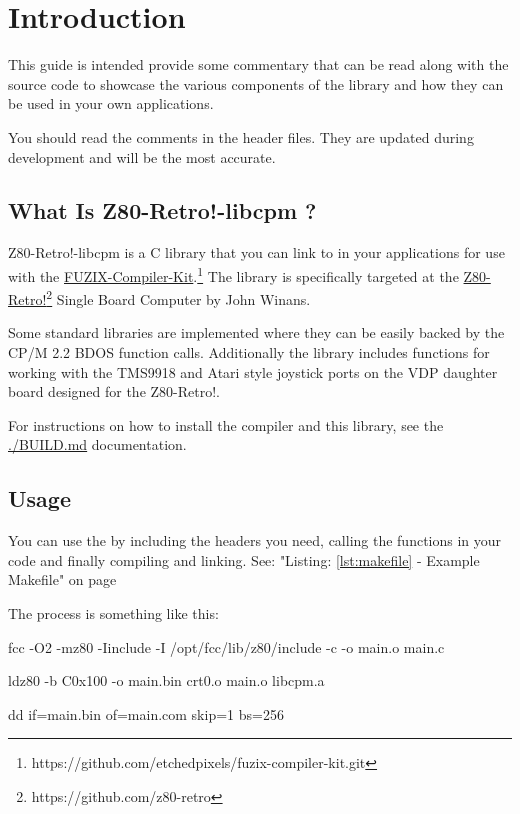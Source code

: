 \documentclass[10pt,a4paper,hidelinks]{article}
\title{\lib}
\author{David Latham}
\date{September, 2025}
\def\lib{Z80-Retro!-libcpm }
\begin{document}
\maketitle
\tableofcontents
\pagebreak
\section{Introduction}

This guide is intended provide some commentary that can be read along with the
source code to showcase the various components of the library and how they can
be used in your own applications.

You should read the comments in the header files.  They are updated during
development and will be the most accurate.

\subsection{What Is \lib?}

\lib is a C library that you can link to in your applications for
use with the
\href{https://github.com/etchedpixels/fuzix-compiler-kit.git}{FUZIX-Compiler-Kit}.\footnote{https://github.com/etchedpixels/fuzix-compiler-kit.git}
The library is specifically targeted at the
\href{https://github.com/z80-retro}{Z80-Retro!}\footnote{https://github.com/z80-retro} Single Board Computer by John
Winans.

Some standard libraries are implemented where they can be easily backed by the
CP/M 2.2 BDOS function calls.  Additionally the library includes functions for
working with the TMS9918 and Atari style joystick ports on the VDP daughter
board designed for the Z80-Retro!.

For instructions on how to install the compiler and this library, see the
\url{./BUILD.md} documentation.

\subsection{Usage}

You can use the by including the headers you need, calling the functions in
your code and finally compiling and linking. See: "Listing: \ref{lst:makefile}
- Example Makefile" on page \pageref{lst:makefile}

The process is something like this:

\begin{description}[font=$\bullet$~\normalfont\scshape\color{red!50!black}]
  \item[Compile] fcc -O2 -mz80 -Iinclude -I /opt/fcc/lib/z80/include -c -o
    main.o main.c
  \item[Link] ldz80 -b C0x100 -o main.bin crt0.o main.o libcpm.a
  \item[Truncate] dd if=main.bin of=main.com skip=1 bs=256
\end{description}
\end{document}
